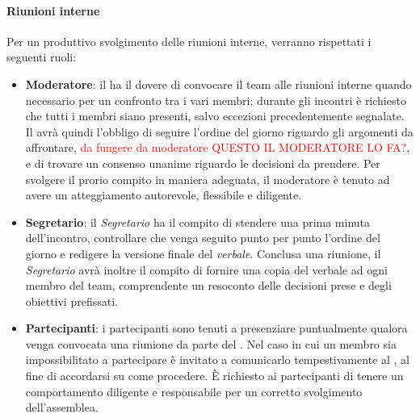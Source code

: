 \paragraph{Riunioni interne}
Per un produttivo svolgimento delle riunioni interne, verranno rispettati i seguenti ruoli:
\begin{itemize}
\item\textbf{Moderatore}: il \RdP{} ha il dovere di convocare il team alle riunioni interne quando necessario per un confronto tra i vari membri;
durante gli incontri è richiesto che tutti i membri siano presenti, salvo eccezioni precedentemente segnalate.
Il \RdP{} avrà quindi l'obbligo di seguire l'ordine del giorno riguardo gli argomenti da affrontare,
\textcolor{red}{da fungere da moderatore QUESTO IL MODERATORE LO FA?}, e di trovare un consenso unanime riguardo le decisioni da prendere.
Per svolgere il prorio compito in maniera adeguata, il moderatore è tenuto ad avere un atteggiamento autorevole, flessibile
e diligente.
\item\textbf{Segretario}: il \emph{Segretario} ha il compito di stendere una prima minuta dell'incontro, controllare che venga seguito punto per punto l'ordine del giorno e redigere la versione finale del \emph{verbale}.
Conclusa una riunione, il \emph{Segretario} avrà inoltre il compito di fornire una copia del verbale ad ogni membro del team,
comprendente un resoconto delle decisioni prese e degli obiettivi prefissati.
\item\textbf{Partecipanti}: i partecipanti sono tenuti a presenziare puntualmente qualora venga convocata una riunione da parte del \RdP{}. Nel caso in cui un membro sia impossibilitato a partecipare è invitato
a comunicarlo tempestivamente al \RdP, al fine di accordarsi su come procedere. È richiesto ai partecipanti di
tenere un comportamento diligente e responsabile per un corretto svolgimento dell'assemblea.
\end{itemize}

